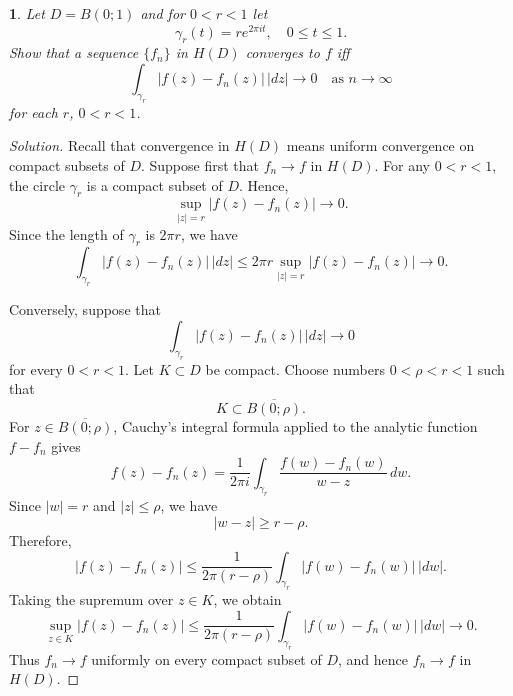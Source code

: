 \documentclass[12pt, a4paper]{report}
\theoremstyle{spaced}
\newtheorem{exercise}{}
\newcommand{\setexercise}[1]{\setcounter{exercise}{#1-1}}
\begin{document}
\setexercise{9}
\begin{exercise}
	Let $D=B(0;1)$ and for $0<r<1$ let
	\[
		\gamma_r(t)=re^{2\pi i t}, \quad 0\le t\le 1.
	\]
	Show that a sequence $\{f_n\}$ in $H(D)$ converges to $f$ iff
	\[
		\int_{\gamma_r} |f(z)-f_n(z)|\,|dz|\to 0
		\quad \text{as } n\to\infty
	\]
	for each $r$, $0<r<1$.
\end{exercise}
\begin{proof}[Solution]
	Recall that convergence in \(H(D)\) means uniform convergence on compact
	subsets of \(D\).
	Suppose first that \(f_n \to f\) in \(H(D)\). For any \(0<r<1\), the
	circle \(\gamma_r\) is a compact subset of \(D\). Hence,
	\[
		\sup_{|z|=r}|f(z)-f_n(z)|\longrightarrow 0.
	\]
	Since the length of \(\gamma_r\) is \(2\pi r\), we have
	\[
		\int_{\gamma_r}|f(z)-f_n(z)|\,|dz|
		\leq 2\pi r\sup_{|z|=r}|f(z)-f_n(z)|
		\longrightarrow 0.
	\]

	Conversely, suppose that
	\[
		\int_{\gamma_r}|f(z)-f_n(z)|\,|dz|\longrightarrow 0
	\]
	for every \(0<r<1\). Let \(K\subset D\) be compact. Choose numbers
	\(0<\rho<r<1\) such that
	\[
		K\subset \overline{B(0;\rho)}.
	\]
	For \(z\in \overline{B(0;\rho)}\), Cauchy's integral formula applied to
	the analytic function \(f-f_n\) gives
	\[
		f(z)-f_n(z)
		=
		\frac{1}{2\pi i}
		\int_{\gamma_r}
		\frac{f(w)-f_n(w)}{w-z}\,dw.
	\]
	Since \(|w|=r\) and \(|z|\leq \rho\), we have
	\[
		|w-z|\geq r-\rho.
	\]
	Therefore,
	\[
		|f(z)-f_n(z)|
		\leq
		\frac{1}{2\pi(r-\rho)}
		\int_{\gamma_r}|f(w)-f_n(w)|\,|dw|.
	\]
	Taking the supremum over \(z\in K\), we obtain
	\[
		\sup_{z\in K}|f(z)-f_n(z)|
		\leq
		\frac{1}{2\pi(r-\rho)}
		\int_{\gamma_r}|f(w)-f_n(w)|\,|dw|
		\longrightarrow 0.
	\]
	Thus \(f_n\to f\) uniformly on every compact subset of \(D\), and hence
	\(f_n\to f\) in \(H(D)\).
\end{proof}
\end{document}
